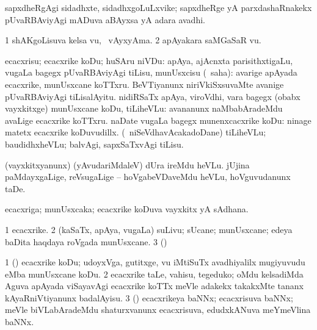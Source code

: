 {\bentry
{} 
\gl{\nA}
\expl{}
\bmng
sapxdheRgAgi sidadhxte, sidadhxgoLuLxvike; sapxdheRge yA parxdashaRnakekx pUvaRBAviyAgi mADuva aBAyxsa yA adara avadhi. 
\emng
\eentry

\bentry
{} 
\gl{\nA}
\expl{}
\bmng
\bnum
\num{1} shAKgoLisuva kelsa \mo vu, \udA\ vAyxyAma. 
\num{2} apAyakara saMGaSaR \mo vu. 
\enum
\emng
\eentry

\bentry
{} 
\gl{\sakirx}
\expl{}
\bmng
ecacxrisu; ecacxrike koDu; huSAru niVDu: 
\banum
{} apAya, ajAcnxta parisithxtigaLu, \mo vugaLa bagegx pUvaRBAviyAgi tiLisu, munUsxcisu (\akirx\ saha):  avarige apAyada ecacxrike, munUsxcane koTTxru.  BeVTiyanunx niriVkiSxsuvaMte avanige pUvaRBAviyAgi tiLisalAyitu. 
 nidiRSaTx apAya, viroVdhi, \mo vara bagegx (obabx vayxkitxge) munUsxcane koDu, tiLiheVLu:  avananunx naMbabAradeMdu avaLige ecacxrike koTTxru. 
 naDate \mo vugaLa bagegx munenxcacxrike koDu:  ninage matetx ecacxrike koDuvudillx. 
 (\sA\ niSeVdhavAcakadoDane) tiLiheVLu; baudidhxheVLu; balvAgi, sapxSaTxvAgi tiLisu. 
\eanum
\emng

\noindent
\gl{\pagu}
\expl{}
\bmng
\bnum
{}  
\banum
{} (vayxkitxyanunx) (yAvudariMdaleV) dUra ireMdu heVLu. 
 jUjina paMdayxgaLige, reVsugaLige -- hoVgabeVDaveMdu heVLu, hoVguvudanunx taDe. 
\eanum
\numie
\enum
\emng
\eentry

\bentry 
{} 
\gl{\nA}
\expl{}
\bmng
ecacxriga; munUsxcaka; ecacxrike koDuva vayxkitx yA sAdhana. 
\emng
\eentry

\bentry
{} 
\gl{\nA}
\expl{}
\bmng
\bnum
\num{1} ecacxrike. 
\num{2} (kaSaTx, apAya, \mo vugaLa) suLivu; sUcane; munUsxcane;  edeya baDita haqdaya roVgada munUsxcane. 
\num{3} (\pArxparx)  
\enum
\emng

\noindent 
\gl{\pagu}
\expl{}
\bmng
\bnum
\num{1}  (\pArxparx) ecacxrike koDu; udoyxVga, gutitxge, \mo vu iMtiSuTx avadhiyalilx mugiyuvudu eMba munUsxcane koDu. 
\num{2}  ecacxrike taLe, vahisu, tegeduko; oMdu kelsadiMda Aguva apAyada viSayavAgi ecacxrike koTTx meVle adakekx takakxMte tananx kAyaRniVtiyanunx badalAyisu. 
\num{3}  (\jiVvi) ecacxrikeya baNNx; ecacxrisuva baNNx; meVle biVLabAradeMdu shaturxvanunx ecacxrisuva, edudxkANuva meYmeVlina baNNx. 
\enum
\emng
\eentry

}
